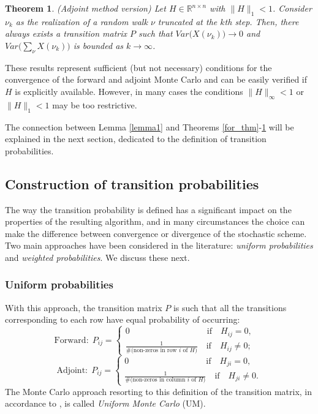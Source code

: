 \documentclass[times]{nlaauth}
\newtheorem{thm}{Theorem}
\begin{document}
\begin{thm}\textit{(Adjoint method version)}
 Let $H\in \mathbb{R}^{n\times n}$ with $\lVert H\rVert_{1}<1$.
Consider $\nu_k$ as the realization of a random walk $\nu$ truncated at the
$k$th step. Then,
there always exists a
transition matrix $P$ such that
$Var\Big(X(\nu_k)\Big)\rightarrow 0$ and
$Var\Big(\sum_{\nu}X(\nu_k)\Big)$ is bounded as $k\rightarrow \infty$.
\label{adj_thm}
\end{thm}

These results represent sufficient (but not necessary) conditions
for the convergence
of the forward and adjoint Monte Carlo and can be easily verified if $H$ is explicitly
available.
However, in many cases the conditions $\lVert H\rVert_{\infty}<1$ or
$\lVert H\rVert_1<1$ may be too restrictive.

The connection between Lemma \ref{lemma1} and Theorems \ref{for_thm}-\ref{adj_thm}
will be explained in
the next section, dedicated to the definition of transition probabilities.


\subsection{Construction of transition probabilities}

The way the transition probability is defined has a significant impact
on the properties of the resulting algorithm, and in many circumstances the
choice can make the difference between convergence or divergence of the stochastic
scheme.  Two main approaches have been considered in the literature:
\textit{uniform probabilities} and \textit{weighted probabilities}.
We discuss these next.

\subsubsection{Uniform probabilities}

With this approach, the transition matrix $P$ is such that all the
transitions corresponding to each row have equal probability of occurring:
\[
\text{Forward}:\;P_{ij}=
\begin{cases}
0 \quad \quad \quad \qquad \qquad \qquad \text{if}\quad H_{ij}=0, \\
\frac{1}{\#(\text{non-zeros in row $i$ of $H$)}} \quad \text{if} \quad H_{ij}\ne 0;
\end{cases}\quad
\]
\[
\text{Adjoint}:\;P_{ij}=
\begin{cases}
0 \quad \quad \quad \qquad \qquad \qquad \text{if}\quad H_{ji}=0, \\
\frac{1}{\#(\text{non-zeros in column $i$ of $H$)}} \quad \text{if} \quad H_{ji}\ne 0.
\end{cases}
\]
The Monte Carlo approach resorting to this definition of the transition matrix,
in accordance to \cite{AADBTW2005}, is called \textit{Uniform Monte Carlo} (UM).
\end{document}
